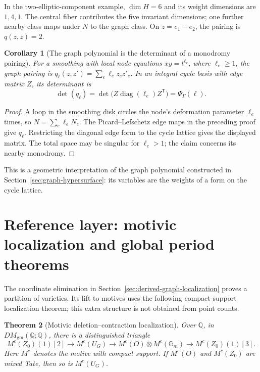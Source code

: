 \documentclass[11pt]{article}
\newtheorem{theorem}{Theorem}[section]
\newtheorem{corollary}[theorem]{Corollary}
\theoremstyle{definition}
\theoremstyle{remark}
\newcommand{\Q}{\mathbb Q}
\begin{document}
In the two-elliptic-component example, $\dim H=6$ and its weight dimensions
are $1,4,1$. The central fiber contributes the five invariant dimensions;
one further nearby class maps under $N$ to the graph class. On
$z=e_1-e_2$, the pairing is $q(z,z)=2$.

\begin{corollary}[The graph polynomial is the determinant of a monodromy pairing]
\label{cor:derived-monodromy-determinant}
For a smoothing with local node equations $xy=t^{\ell_e}$, where
$\ell_e\ge1$, the graph pairing is
$q_\ell(z,z')=\sum_e\ell_ez_ez'_e$. In an integral cycle basis with edge
matrix $Z$, its determinant is
\[
 \det(q_\ell)=\det\bigl(Z\operatorname{diag}(\ell_e)Z^{\mathsf T}\bigr)
             =\Psi_\Gamma(\ell).
\]
\end{corollary}
\begin{proof}
A loop in the smoothing disk circles the node's deformation parameter
$\ell_e$ times, so $N=\sum_e\ell_eN_e$. The Picard--Lefschetz edge maps
in the preceding proof give $q_\ell$. Restricting the diagonal edge form
to the cycle lattice gives the displayed matrix. The total space may be
singular for $\ell_e>1$; the claim concerns its nearby monodromy.
\end{proof}
This is a geometric interpretation of the graph polynomial constructed
in Section~\ref{sec:graph-hypersurface}: its variables are the weights of a form on the cycle lattice.

\section{Reference layer: motivic localization and global period theorems}
\label{sec:background-periods}

The coordinate elimination in Section~\ref{sec:derived-graph-localization} proves a partition of varieties. Its lift to motives uses the following compact-support localization theorem; this extra structure is not obtained from point counts.

\begin{theorem}[Motivic deletion--contraction localization]
\label{thm:derived-graph-localization}
Over $\Q$, in $DM_{\mathrm{gm}}(\Q;\Q)$, there is a distinguished triangle
\begin{equation}\label{eq:derived-graph-localization}
 M^c(Z_0)(1)[2]\longrightarrow M^c(U_G)
 \longrightarrow M^c(O)\otimes M^c(\mathbb G_m)
 \longrightarrow M^c(Z_0)(1)[3].
\end{equation}
Here $M^c$ denotes the motive with compact support. If $M^c(O)$ and
$M^c(Z_0)$ are mixed Tate, then so is $M^c(U_G)$.
\end{theorem}
\end{document}
